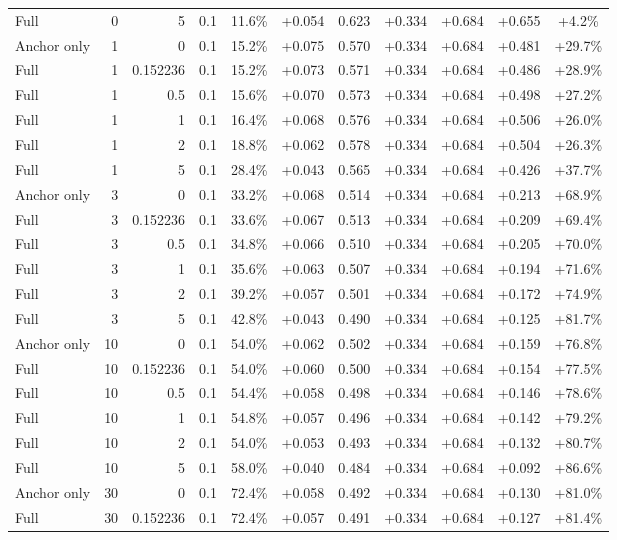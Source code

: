 \begin{table}[htbp]
\begin{tabular}{lrrrccccccc}
Full & 0 & 5 & 0.1 & 11.6\% & +0.054 & 0.623 & +0.334 & +0.684 & +0.655 & +4.2\% \\
Anchor only & 1 & 0 & 0.1 & 15.2\% & +0.075 & 0.570 & +0.334 & +0.684 & +0.481 & +29.7\% \\
Full & 1 & 0.152236 & 0.1 & 15.2\% & +0.073 & 0.571 & +0.334 & +0.684 & +0.486 & +28.9\% \\
Full & 1 & 0.5 & 0.1 & 15.6\% & +0.070 & 0.573 & +0.334 & +0.684 & +0.498 & +27.2\% \\
Full & 1 & 1 & 0.1 & 16.4\% & +0.068 & 0.576 & +0.334 & +0.684 & +0.506 & +26.0\% \\
Full & 1 & 2 & 0.1 & 18.8\% & +0.062 & 0.578 & +0.334 & +0.684 & +0.504 & +26.3\% \\
Full & 1 & 5 & 0.1 & 28.4\% & +0.043 & 0.565 & +0.334 & +0.684 & +0.426 & +37.7\% \\
Anchor only & 3 & 0 & 0.1 & 33.2\% & +0.068 & 0.514 & +0.334 & +0.684 & +0.213 & +68.9\% \\
Full & 3 & 0.152236 & 0.1 & 33.6\% & +0.067 & 0.513 & +0.334 & +0.684 & +0.209 & +69.4\% \\
Full & 3 & 0.5 & 0.1 & 34.8\% & +0.066 & 0.510 & +0.334 & +0.684 & +0.205 & +70.0\% \\
Full & 3 & 1 & 0.1 & 35.6\% & +0.063 & 0.507 & +0.334 & +0.684 & +0.194 & +71.6\% \\
Full & 3 & 2 & 0.1 & 39.2\% & +0.057 & 0.501 & +0.334 & +0.684 & +0.172 & +74.9\% \\
Full & 3 & 5 & 0.1 & 42.8\% & +0.043 & 0.490 & +0.334 & +0.684 & +0.125 & +81.7\% \\
Anchor only & 10 & 0 & 0.1 & 54.0\% & +0.062 & 0.502 & +0.334 & +0.684 & +0.159 & +76.8\% \\
Full & 10 & 0.152236 & 0.1 & 54.0\% & +0.060 & 0.500 & +0.334 & +0.684 & +0.154 & +77.5\% \\
Full & 10 & 0.5 & 0.1 & 54.4\% & +0.058 & 0.498 & +0.334 & +0.684 & +0.146 & +78.6\% \\
Full & 10 & 1 & 0.1 & 54.8\% & +0.057 & 0.496 & +0.334 & +0.684 & +0.142 & +79.2\% \\
Full & 10 & 2 & 0.1 & 54.0\% & +0.053 & 0.493 & +0.334 & +0.684 & +0.132 & +80.7\% \\
Full & 10 & 5 & 0.1 & 58.0\% & +0.040 & 0.484 & +0.334 & +0.684 & +0.092 & +86.6\% \\
Anchor only & 30 & 0 & 0.1 & 72.4\% & +0.058 & 0.492 & +0.334 & +0.684 & +0.130 & +81.0\% \\
Full & 30 & 0.152236 & 0.1 & 72.4\% & +0.057 & 0.491 & +0.334 & +0.684 & +0.127 & +81.4\% \\

\end{tabular}
\end{table}

